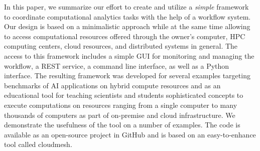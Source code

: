 
In this paper, we summarize our effort to create and utilize a {\em simple} framework to coordinate computational analytics tasks with the help of a workflow system. Our design is based on a minimalistic approach while at the same time allowing to access computational resources offered through the owner's computer, HPC computing centers, cloud resources, and distributed systems in general. The access to this framework includes a simple GUI for monitoring and managing the workflow, a REST service, a command line interface, as well as a Python interface. The resulting framework was developed for several examples targeting benchmarks of AI applications on hybrid compute resources and as an educational tool for teaching scientists and students sophisticated concepts to execute computations on resources ranging from a single computer to many thousands of computers as part of on-premise and cloud infrastructure. We demonstrate the usefulness of the tool on a number of examples. The code is available as an open-source project in GitHub and is based on an easy-to-enhance tool called cloudmesh.